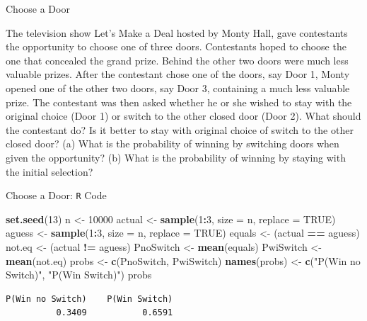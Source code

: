 \documentclass[
  ignorenonframetext,
]{beamer}
\newenvironment{Shaded}{\begin{snugshade}}{\end{snugshade}}
\newcommand{\AttributeTok}[1]{\textcolor[rgb]{0.13,0.29,0.53}{#1}}
\newcommand{\ConstantTok}[1]{\textcolor[rgb]{0.56,0.35,0.01}{#1}}
\newcommand{\DecValTok}[1]{\textcolor[rgb]{0.00,0.00,0.81}{#1}}
\newcommand{\FunctionTok}[1]{\textcolor[rgb]{0.13,0.29,0.53}{\textbf{#1}}}
\newcommand{\NormalTok}[1]{#1}
\newcommand{\OtherTok}[1]{\textcolor[rgb]{0.56,0.35,0.01}{#1}}
\newcommand{\SpecialCharTok}[1]{\textcolor[rgb]{0.81,0.36,0.00}{\textbf{#1}}}
\newcommand{\StringTok}[1]{\textcolor[rgb]{0.31,0.60,0.02}{#1}}
\begin{document}
\begin{frame}{Choose a Door}
\protect\hypertarget{choose-a-door}{}
\begin{tcolorbox}
The television show Let's Make a Deal hosted by Monty Hall, gave contestants the opportunity to choose one of three doors. Contestants hoped to choose the one that concealed the grand prize. Behind the other two doors were much less valuable prizes. After the contestant chose one of the doors, say Door 1, Monty opened one of the other two doors, say Door 3, containing a much less valuable prize. The contestant was then asked whether he or she wished to stay with the original choice (Door 1) or switch to the other closed door (Door 2). What should the contestant do? Is it better to stay with original choice of switch to the other closed door? (a) What is the probability of winning by switching doors when given the opportunity? (b) What is the probability of winning by staying with the initial selection?


\end{tcolorbox}
\end{frame}

\begin{frame}[fragile]{Choose a Door: \texttt{R} Code}
\protect\hypertarget{choose-a-door-r-code}{}
\small

\begin{Shaded}
\begin{Highlighting}[]
\FunctionTok{set.seed}\NormalTok{(}\DecValTok{13}\NormalTok{)}
\NormalTok{n }\OtherTok{\textless{}{-}} \DecValTok{10000}
\NormalTok{actual }\OtherTok{\textless{}{-}} \FunctionTok{sample}\NormalTok{(}\DecValTok{1}\SpecialCharTok{:}\DecValTok{3}\NormalTok{, }\AttributeTok{size =}\NormalTok{ n, }\AttributeTok{replace =} \ConstantTok{TRUE}\NormalTok{)}
\NormalTok{aguess }\OtherTok{\textless{}{-}} \FunctionTok{sample}\NormalTok{(}\DecValTok{1}\SpecialCharTok{:}\DecValTok{3}\NormalTok{, }\AttributeTok{size =}\NormalTok{ n, }\AttributeTok{replace =} \ConstantTok{TRUE}\NormalTok{)}
\NormalTok{equals }\OtherTok{\textless{}{-}}\NormalTok{ (actual }\SpecialCharTok{==}\NormalTok{ aguess)}
\NormalTok{not.eq }\OtherTok{\textless{}{-}}\NormalTok{ (actual }\SpecialCharTok{!=}\NormalTok{ aguess)}
\NormalTok{PnoSwitch }\OtherTok{\textless{}{-}} \FunctionTok{mean}\NormalTok{(equals)}
\NormalTok{PwiSwitch }\OtherTok{\textless{}{-}} \FunctionTok{mean}\NormalTok{(not.eq)}
\NormalTok{probs }\OtherTok{\textless{}{-}} \FunctionTok{c}\NormalTok{(PnoSwitch, PwiSwitch)}
\FunctionTok{names}\NormalTok{(probs) }\OtherTok{\textless{}{-}} \FunctionTok{c}\NormalTok{(}\StringTok{"P(Win no Switch)"}\NormalTok{, }\StringTok{"P(Win Switch)"}\NormalTok{)}
\NormalTok{probs}
\end{Highlighting}
\end{Shaded}

\begin{verbatim}
P(Win no Switch)    P(Win Switch) 
          0.3409           0.6591 
\end{verbatim}

\normalsize
\end{frame}
\end{document}
